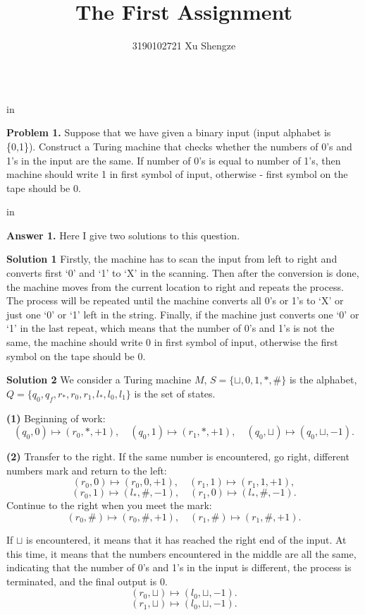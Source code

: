 \documentclass[11pt]{article}
\begin{document}
\title{{\bf The First Assignment}}
\author{3190102721 Xu Shengze}
\date{}
\maketitle

\begin{tabular*}{13cm}{r}
\hline
\end{tabular*}

 in

{\bf Problem 1.} Suppose that we have given a binary input (input alphabet is \{0,1\}).
Construct a Turing machine that checks whether the numbers of 0's and 1's in the input
are the same. If number of 0's is equal to number of 1's, then machine should write 1 in
first symbol of input, otherwise - first symbol on the tape should be 0.

 in

{\bf Answer 1.} Here I give two solutions to this question.

\textbf{Solution 1} Firstly, the machine has to scan the input from left to right and converts first `0' and `1' to `X' in the scanning. Then after the conversion is done, the machine moves from the current location to right and repeats the process. The process will be repeated until the machine converts all 0's or 1's to `X' or just one `0' or `1' left in the string. Finally, if the machine just converts one `0' or `1' in the last repeat, which means that the number of 0's and 1's is not the same, the machine should write 0 in first symbol of input, otherwise the first symbol on the tape should be 0.

\textbf{Solution 2} We consider a Turing machine $M$, $S=\{\sqcup ,0,1,\ast,\#\}$ is the alphabet, $Q=\{q_0,q_f,r_{\ast},r_0,r_1,l_{\ast},l_0,l_1\}$ is the set of states.

{\bf (1)} Beginning of work: 
$$
(q_0, 0) \mapsto (r_0, \ast, +1), \quad (q_0, 1)\mapsto (r_1, \ast, +1), \quad (q_0,\sqcup) \mapsto (q_0 ,\sqcup, -1).
$$

{\bf (2)} Transfer to the right. If the same number is encountered, go right, different numbers mark and return to the left:
$$
(r_0, 0) \mapsto (r_0, 0, +1), \quad (r_1, 1)\mapsto (r_1, 1, +1),
$$
$$
(r_0, 1) \mapsto (l_{\ast}, \#, -1), \quad (r_1, 0)\mapsto (l_{\ast}, \#, -1).
$$
Continue to the right when you meet the mark:
$$
(r_0, \#) \mapsto (r_0, \#, +1), \quad (r_1, \#)\mapsto (r_1, \#, +1).
$$

If $\sqcup$ is encountered, it means that it has reached the right end of the input. At this time, it means that the numbers encountered in the middle are all the same, indicating that the number of 0's and 1's in the input is different, the process is terminated, and the final output is 0.
$$
(r_0, \sqcup) \mapsto (l_0, \sqcup, -1).
$$
$$
(r_1, \sqcup) \mapsto (l_0, \sqcup, -1).
$$
\end{document}
